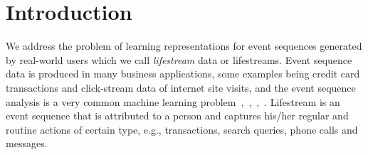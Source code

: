 \documentclass[sigconf, anonymous]{acmart}
\begin{document}
\section{Introduction} \label{sec-intro}

We address the problem of learning representations for event sequences generated by real-world users which we call \emph{lifestream} data or lifestreams. Event sequence data is produced in many business applications, some examples being credit card transactions and click-stream data of internet site visits, and the event sequence analysis is a very common machine learning problem~\cite{laxman2008stream},~\cite{wiese2009credit},~\cite{zhang2017credit},~\cite{bigon2019prediction}. Lifestream is an event sequence that is attributed to a person and captures his/her regular and routine actions of certain type, e.g., transactions, search queries, phone calls and messages.





\end{document}

